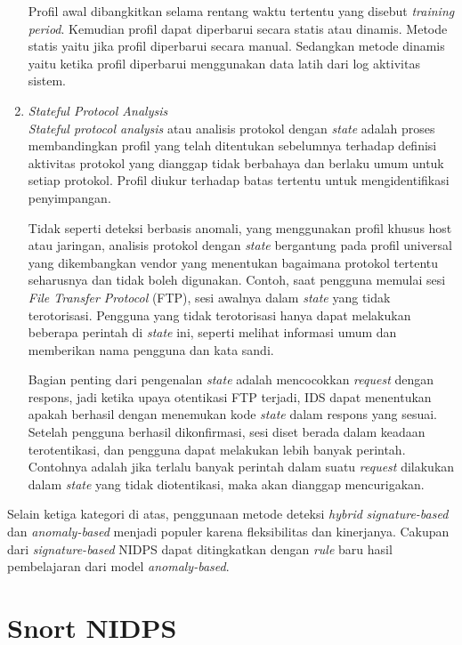 \begin{enumerate}
      Profil awal dibangkitkan selama rentang waktu tertentu yang disebut \emph{training period}. Kemudian profil dapat diperbarui secara statis atau dinamis. Metode statis yaitu jika profil diperbarui secara manual. Sedangkan metode dinamis yaitu ketika profil diperbarui menggunakan data latih dari log aktivitas sistem.\clearpage

      \item
      \emph{Stateful Protocol Analysis} \\
      \emph{Stateful protocol analysis} atau analisis protokol dengan \emph{state} adalah proses membandingkan profil yang telah ditentukan sebelumnya terhadap definisi aktivitas protokol yang dianggap tidak berbahaya dan berlaku umum untuk setiap protokol. Profil diukur terhadap batas tertentu untuk mengidentifikasi penyimpangan. 

      Tidak seperti deteksi berbasis anomali, yang menggunakan profil khusus host atau jaringan, analisis protokol dengan \emph{state} bergantung pada profil universal yang dikembangkan vendor yang menentukan bagaimana protokol tertentu seharusnya dan tidak boleh digunakan. Contoh, saat pengguna memulai sesi \emph{File Transfer Protocol} (FTP), sesi awalnya dalam \emph{state} yang tidak terotorisasi. Pengguna yang tidak terotorisasi hanya dapat melakukan beberapa perintah di \emph{state} ini, seperti melihat informasi umum dan memberikan nama pengguna dan kata sandi. 

      Bagian penting dari pengenalan \emph{state} adalah mencocokkan \emph{request} dengan respons, jadi ketika upaya otentikasi FTP terjadi, IDS dapat menentukan apakah berhasil dengan menemukan kode \emph{state} dalam respons yang sesuai. Setelah pengguna berhasil dikonfirmasi, sesi diset berada dalam keadaan terotentikasi, dan pengguna dapat melakukan lebih banyak perintah. Contohnya adalah jika terlalu banyak perintah dalam suatu \emph{request} dilakukan dalam \emph{state} yang tidak diotentikasi, maka akan dianggap mencurigakan. 

    \end{enumerate}

    Selain ketiga kategori di atas, penggunaan metode deteksi \emph{hybrid} \emph{signature-based} dan \emph{anomaly-based} menjadi populer karena fleksibilitas dan kinerjanya. Cakupan dari \emph{signature-based} NIDPS dapat ditingkatkan dengan \emph{rule} baru hasil pembelajaran dari model \emph{anomaly-based}.

\section{Snort NIDPS}

